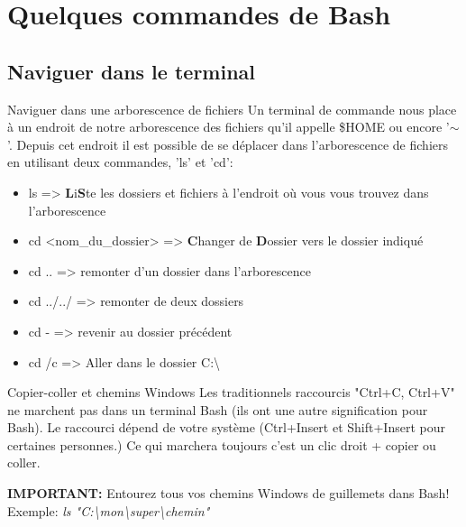 \documentclass{beamer}
\begin{document}
\section{Quelques commandes de Bash}

\subsection{Naviguer dans le terminal}

\begin{frame}[fragile]{Naviguer dans une arborescence de fichiers}
Un terminal de commande nous place à un endroit de notre arborescence des fichiers qu'il appelle \$HOME ou encore '$\sim$'. Depuis cet endroit il est possible de se déplacer dans l'arborescence de fichiers en utilisant deux commandes, 'ls' et 'cd':\\

\begin{itemize}
    \item ls => \textbf{L}i\textbf{S}te les dossiers et fichiers à l'endroit où vous vous trouvez dans l'arborescence
    \item cd <nom\_du\_dossier> => \textbf{C}hanger de \textbf{D}ossier vers le dossier indiqué
    \item cd .. => remonter d'un dossier dans l'arborescence
    \item cd ../../ => remonter de deux dossiers
    \item cd - => revenir au dossier précédent
    \item cd /c => Aller dans le dossier C:\textbackslash
\end{itemize}
\end{frame}

\begin{frame}{Copier-coller et chemins Windows}
Les traditionnels raccourcis "Ctrl+C, Ctrl+V" ne marchent pas dans un terminal Bash (ils ont une autre signification pour Bash). Le raccourci dépend de votre système (Ctrl+Insert et Shift+Insert pour certaines personnes.) Ce qui marchera toujours c'est un clic droit + copier ou coller.\\
\bigskip

\textbf{IMPORTANT:} Entourez tous vos chemins Windows de guillemets dans Bash! Exemple: \textit{ls "C:\textbackslash mon\textbackslash super\textbackslash chemin"}
\end{frame}
\end{document}
